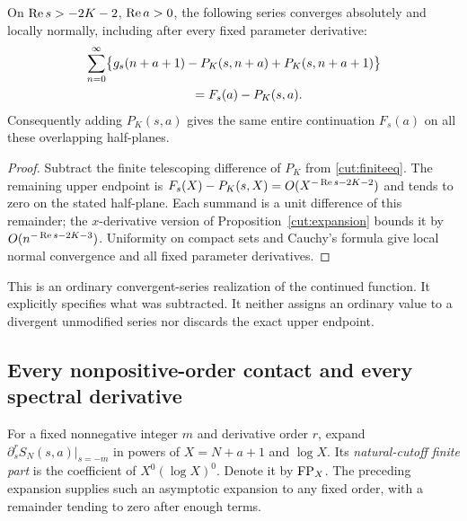 \begin{theorem}\label{cut:normal}
On $\operatorname{Re} s>-2K-2$, $\operatorname{Re} a>0$, the following series converges absolutely
and locally normally, including after every fixed parameter derivative:
\begin{align}
 &\sum_{n=0}^{\infty}\bigl\{
    g_s(n+a+1)-P_K(s,n+a)+P_K(s,n+a+1)\bigr\}\notag\\
 &\hspace{30mm}=F_s(a)-P_K(s,a).
 \label{cut:normaleq}
\end{align}
Consequently adding $P_K(s,a)$ gives the same entire continuation
$F_s(a)$ on all these overlapping half-planes.
\end{theorem}
\begin{proof}
Subtract the finite telescoping difference of $P_K$ from
\eqref{cut:finiteeq}. The remaining upper endpoint is
$F_s(X)-P_K(s,X)=O(X^{-\operatorname{Re} s-2K-2})$ and tends to zero on the stated
half-plane. Each summand is a unit difference of this remainder; the
$x$-derivative version of Proposition~\ref{cut:expansion} bounds it by
$O(n^{-\operatorname{Re} s-2K-3})$. Uniformity on compact sets and Cauchy's formula
give local normal convergence and all fixed parameter derivatives.
\end{proof}

This is an ordinary convergent-series realization of the continued
function. It explicitly specifies what was subtracted. It neither assigns
an ordinary value to a divergent unmodified series nor discards the exact
upper endpoint.

\subsection{Every nonpositive-order contact and every spectral derivative}

For a fixed nonnegative integer $m$ and derivative order $r$, expand
$\partial_s^rS_N(s,a)|_{s=-m}$ in powers of $X=N+a+1$ and $\log X$.
Its \emph{natural-cutoff finite part} is the coefficient of
$X^0(\log X)^0$. Denote it by $\operatorname{FP}_X$.
The preceding expansion supplies such an asymptotic expansion to any
fixed order, with a remainder tending to zero after enough terms.

